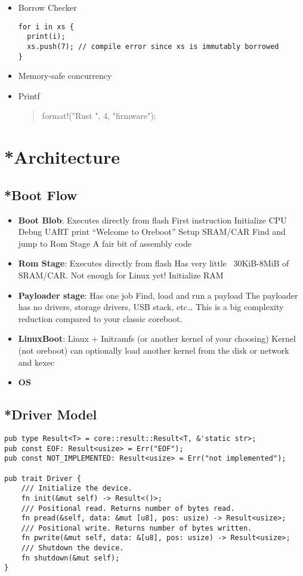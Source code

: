 \documentclass[conference]{IEEEtran}
\begin{document}
\begin{itemize}
    \item Borrow Checker
        \begin{verbatim}
for i in xs {
  print(i);
  xs.push(7); // compile error since xs is immutably borrowed
}
        \end{verbatim}
    \item Memory-safe concurrency
    \item Printf \begin{quote}format!("Rust {} {}", 4, "firmware");\end{quote}
\end{itemize}

\section{*Architecture}

\subsection{*Boot Flow}

\begin{itemize}
    \item \textbf{Boot Blob}: Executes directly from flash
First instruction
Initialize CPU
Debug UART print “Welcome to Oreboot”
Setup SRAM/CAR
Find and jump to Rom Stage
A fair bit of assembly code
    \item \textbf{Rom Stage}: Executes directly from flash
Has very little ~30KiB-8MiB of SRAM/CAR. Not enough for Linux yet!
Initialize RAM
    \item \textbf{Payloader stage}: Has one job
Find, load and run a payload
The payloader has no drivers, storage drivers, USB stack, etc… This is a big complexity reduction compared to your classic coreboot.
    \item \textbf{LinuxBoot}: Linux + Initramfs (or another kernel of your choosing)
Kernel (not oreboot) can optionally load another kernel from the disk or network and kexec
    \item \textbf{OS}
\end{itemize}

\subsection{*Driver Model}

\begin{verbatim}
pub type Result<T> = core::result::Result<T, &'static str>;
pub const EOF: Result<usize> = Err("EOF");
pub const NOT_IMPLEMENTED: Result<usize> = Err("not implemented");

pub trait Driver {
	/// Initialize the device.
	fn init(&mut self) -> Result<()>;
	/// Positional read. Returns number of bytes read.
	fn pread(&self, data: &mut [u8], pos: usize) -> Result<usize>;
	/// Positional write. Returns number of bytes written.
	fn pwrite(&mut self, data: &[u8], pos: usize) -> Result<usize>;
	/// Shutdown the device.
	fn shutdown(&mut self);
}
\end{verbatim}
\end{document}
